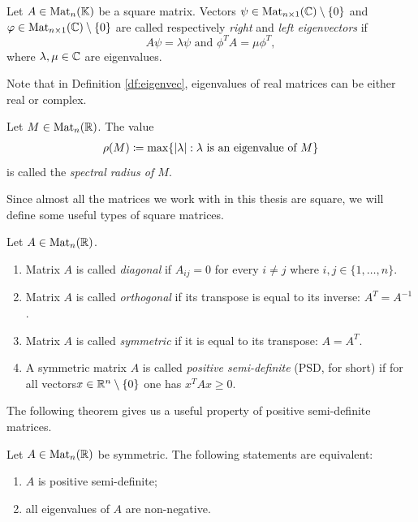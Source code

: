 \begin{df}\label{df:eigenvec}
    Let $A\in\text{Mat}_n(\mathbb{K})$ be a square matrix. Vectors $\psi\in\text{Mat}_{n\times 1}(\mathbb{C})\setminus \{0\}$ and \linebreak $\varphi\in\text{Mat}_{n\times 1}(\mathbb{C})\setminus \{0\}$ are called respectively \textit{right} and \textit{left eigenvectors} if 
    $$
    A\psi = \lambda\psi \text{ and } \phi^T A = \mu \phi^T,
    $$
    where $\lambda,\mu\in\mathbb{C}$ are eigenvalues. 
\end{df}

Note that in Definition \ref{df:eigenvec}, eigenvalues of real matrices can be either real or complex.

\begin{df}
    Let $M\in\text{Mat}_n(\mathbb{R})$. The value
    \begin{gather*}
        \rho(M)\coloneqq\max\{\left|\lambda\right|: \lambda \text{ is an eigenvalue of } M\}
    \end{gather*}
    is called the \textit{spectral radius of $M$}.
\end{df}

Since almost all the matrices we work with in this thesis are square, we will define some useful types of square matrices.
\newpage
\begin{df}
    Let $A\in\text{Mat}_n(\mathbb{R})$. 
    \begin{enumerate}
        \renewcommand{\labelenumi}{\arabic{enumi}.}
        \item Matrix $A$ is called \textit{diagonal} if $A_{ij} = 0$ for every $i\neq j$ where $i,j\in\{1,\dots,n\}$.
        
        \item Matrix $A$ is called \textit{orthogonal} if its transpose is equal to its inverse: $A^T=A^{-1}$. 

        \item Matrix $A$ is called \textit{symmetric} if it is equal to its transpose: $A=A^T$.

        \item A symmetric matrix $A$ is called \textit{positive semi-definite} (PSD, for short) if for all vectors\newline $x\in\mathbb{R}^n\setminus\{0\}$ one has $x^TAx\geq 0$.
    \end{enumerate}
\end{df}

The following theorem gives us a useful property of positive semi-definite matrices.

\begin{theorem}\label{theor:non_neg_eigenval}
    Let $A\in\text{Mat}_n(\mathbb{R})$ be symmetric. The following statements are equivalent:
    \begin{enumerate}
        \renewcommand{\labelenumi}{(\roman*)}
        \item $A$ is positive semi-definite;
        \item all eigenvalues of $A$ are non-negative.
    \end{enumerate}
\end{theorem}

